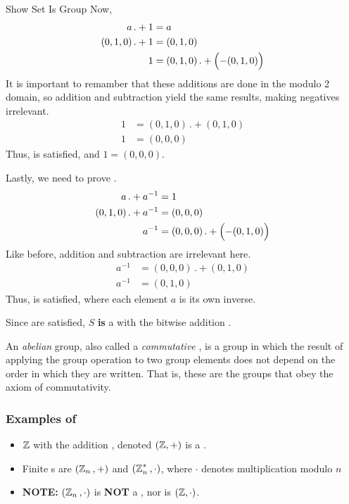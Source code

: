\begin{example}{Show Set Is Group}
  Now, 
  \begin{align*}
    a \, .+ 1 &= a \\
    (0, 1, 0) \, .+ 1 &= (0, 1, 0) \\
    1 &= (0, 1, 0) \, .+ \Bigl( -(0, 1, 0) \Bigr)
  \end{align*}
  It is important to remamber that these additions are done in the modulo 2 domain, so addition and subtraction yield the same results, making negatives irrelevant.
  \begin{align*}
    1 &= (0, 1, 0) \, .+ (0, 1, 0) \\
    1 &= (0, 0, 0)
  \end{align*}
  Thus,  is satisfied, and $1 = (0, 0, 0)$.

  Lastly, we need to prove .
  \begin{align*}
    a \, .+ a^{-1} &= 1 \\
    (0, 1, 0) \, .+ a^{-1} &= (0, 0, 0) \\
    a^{-1} &= (0, 0, 0) \, .+ \Bigl( -(0, 1, 0) \Bigr)
  \end{align*}
  Like before, addition and subtraction are irrelevant here.
  \begin{align*}
    a^{-1} &= (0, 0, 0) \, .+ (0, 1, 0) \\
    a^{-1} &= (0, 1, 0)
  \end{align*}
  Thus,  is satisfied, where each element $a$ is its own inverse.

  Since  are satisfied, $S$ \textbf{is} a  with the bitwise addition .
\end{example}

\begin{definition}[Abelian]\label{def:Abelian}
  An \emph{abelian} group, also called a \emph{commutative }, is a group in which the result of applying the group operation to two group elements does not depend on the order in which they are written.
  That is, these are the groups that obey the axiom of commutativity.
\end{definition}

\subsubsection{Examples of }\label{subsubsec:Examples_of_Groups}
\begin{itemize}[noitemsep]
\item $\operatorname{\mathbb{Z}}$ with the addition , denoted $(\operatorname{\mathbb{Z}}, +)$ is a .
\item Finite s are $(\operatorname{\mathbb{Z}}_{n}{}, +)$ and $(\operatorname{\mathbb{Z}}_{n}^{*}{}, \cdot)$, where $\cdot$ denotes multiplication modulo $n$
\item \textbf{NOTE:} $(\operatorname{\mathbb{Z}}_{n}{}, \cdot)$ is \textbf{NOT} a , nor is $(\operatorname{\mathbb{Z}}, \cdot)$.
\end{itemize}

